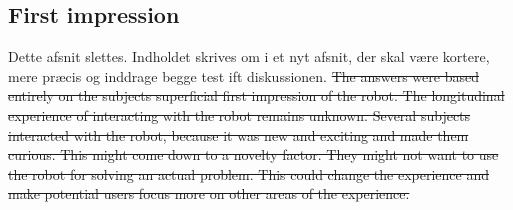 \subsection{First impression}
{\color{red} Dette afsnit slettes. Indholdet skrives om i et nyt afsnit, der skal være kortere, mere præcis og inddrage begge test  ift diskussionen.}
\sout{The answers were based entirely on the subjects superficial first impression of the robot. The longitudinal experience of interacting with the robot remains unknown. Several subjects interacted with the robot, because it was new and exciting and made them curious. This might come down to a novelty factor. They might not want to use the robot for solving an actual problem. This could change the experience and make potential users focus more on other areas of the experience.}
